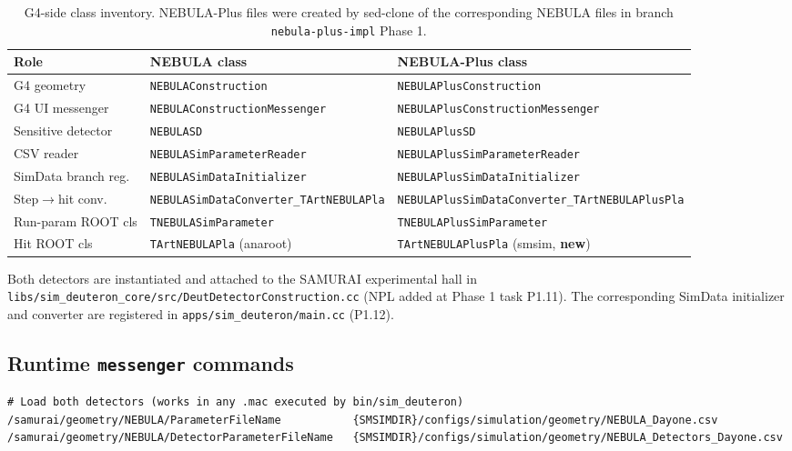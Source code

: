 \documentclass[11pt,a4paper]{article}
\newcommand{\NEB}{NEBULA}
\newcommand{\NPL}{NEBULA-Plus}
\begin{document}
\begin{CJK}{UTF8}{gbsn}
\begin{table}[h]
\centering
\caption{G4-side class inventory. \NPL{} files were created by sed-clone
of the corresponding \NEB{} files in branch \texttt{nebula-plus-impl}
Phase 1.}
\begin{tabular}{lll}
\toprule
Role & \NEB{} class & \NPL{} class\\
\midrule
G4 geometry         & \texttt{NEBULAConstruction}            & \texttt{NEBULAPlusConstruction}\\
G4 UI messenger     & \texttt{NEBULAConstructionMessenger}   & \texttt{NEBULAPlusConstructionMessenger}\\
Sensitive detector  & \texttt{NEBULASD}                      & \texttt{NEBULAPlusSD}\\
CSV reader          & \texttt{NEBULASimParameterReader}      & \texttt{NEBULAPlusSimParameterReader}\\
SimData branch reg. & \texttt{NEBULASimDataInitializer}      & \texttt{NEBULAPlusSimDataInitializer}\\
Step$\to$hit conv.  & \texttt{NEBULASimDataConverter\_TArtNEBULAPla}
                                                             & \texttt{NEBULAPlusSimDataConverter\_TArtNEBULAPlusPla}\\
Run-param ROOT cls  & \texttt{TNEBULASimParameter}           & \texttt{TNEBULAPlusSimParameter}\\
Hit ROOT cls        & \texttt{TArtNEBULAPla} (anaroot)       & \texttt{TArtNEBULAPlusPla} (smsim, \textbf{new})\\
\bottomrule
\end{tabular}
\end{table}

Both detectors are instantiated and attached to the SAMURAI experimental
hall in \texttt{libs/sim\_deuteron\_core/src/DeutDetectorConstruction.cc}
(NPL added at Phase 1 task P1.11). The corresponding SimData initializer
and converter are registered in \texttt{apps/sim\_deuteron/main.cc}
(P1.12).

\subsection{Runtime \texttt{messenger} commands}

\begin{lstlisting}
# Load both detectors (works in any .mac executed by bin/sim_deuteron)
/samurai/geometry/NEBULA/ParameterFileName           {SMSIMDIR}/configs/simulation/geometry/NEBULA_Dayone.csv
/samurai/geometry/NEBULA/DetectorParameterFileName   {SMSIMDIR}/configs/simulation/geometry/NEBULA_Detectors_Dayone.csv


\end{lstlisting}
\end{CJK}
\end{document}
